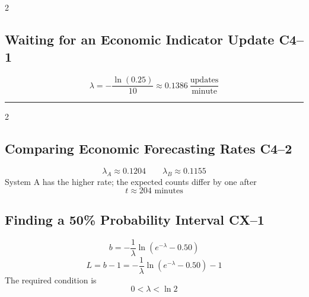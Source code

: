 {\begin{multicols}{2}
			\subsection{Waiting for an Economic Indicator Update \hfill C4--1}
			\[
			\boxed{\lambda=-\frac{\ln(0.25)}{10}
			\approx0.1386\ \frac{\text{updates}}{\text{minute}}}
			\]
			
		\end{multicols}
				\noindent\rule{\textwidth}{0.5pt}
		\begin{multicols}{2}
			
			\subsection{Comparing Economic Forecasting Rates \hfill C4--2}
			\[
			\lambda_A\approx0.1204
			\qquad
			\lambda_B\approx0.1155
			\]
			System A has the higher rate; the expected counts differ by one after
			\[
			\boxed{t\approx204\text{ minutes}}
			\]

			\subsection{Finding a 50\% Probability Interval \hfill CX--1}
			\[
			\boxed{b=-\frac1\lambda
			\ln\left(e^{-\lambda}-0.50\right)}
			\]\[
			\boxed{L=b-1
			=-\frac1\lambda\ln\left(e^{-\lambda}-0.50\right)-1}
			\]
			The required condition is
			\[
			\boxed{0<\lambda<\ln2}
			\]
		\end{multicols}
		\vspace{-5mm}
	}
	
	

